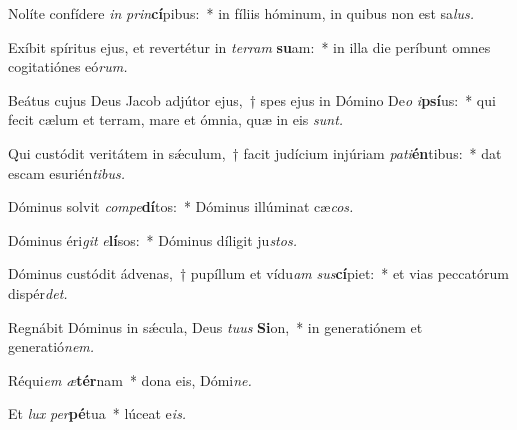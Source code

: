\item Nolíte confídere \textit{in} \textit{prin}\textbf{cí}pibus:~* in fíliis hóminum, in quibus non est sa\hspace*{0.03em}\textit{lus.}
\item Exíbit spíritus ejus, et revertétur in \textit{terram} \textbf{su}am:~* in illa die períbunt omnes cogitatiónes eó\textit{rum.}
\item Beátus cujus Deus Jacob adjútor ejus,~† spes ejus in Dómino De\textit{o} \textit{i}\textbf{psí}us:~* qui fecit cælum et terram, mare et ómnia, quæ in eis \textit{sunt.}
\item Qui custódit veritátem in sǽculum,~† facit judícium injúriam \textit{pati}\textbf{én}tibus:~* dat escam esurién\textit{tibus.}
\item Dóminus solvit \textit{compe}\textbf{dí}tos:~* Dóminus illúminat cæ\hspace*{0.03em}\textit{cos.}
\item Dóminus éri\textit{git} \textit{e}\textbf{lí}sos:~* Dóminus díligit ju\hspace*{0.03em}\textit{stos.}
\item Dóminus custódit ádvenas,~† pupíllum et vídu\hspace*{0.03em}\textit{am} \textit{sus}\textbf{cí}piet:~* et vias peccatórum dispér\textit{det.}
\item Regnábit Dóminus in sǽcula, Deus \textit{tuus} \textbf{Si}on,~* in generatiónem et generatió\textit{nem.}
\item Réqui\hspace*{0.03em}\textit{em} \textit{æ}\textbf{tér}nam~* dona eis, Dómi\textit{ne.}
\item Et \textit{lux} \textit{per}\textbf{pé}tua~* lúceat e\hspace*{0.03em}\textit{is.}